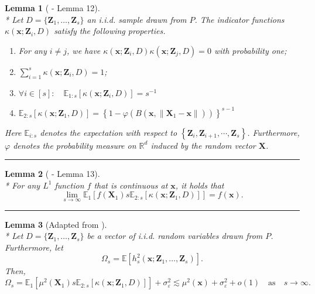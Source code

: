 \documentclass[letterpaper,10pt]{article}
\numberwithin{equation}{section}
\numberwithin{thm}{section}
\newtheorem{lem}{Lemma}
\numberwithin{lem}{section}
\numberwithin{cor}{section}
\newcommand{\E}{\mathbb{E}}
\newcommand{\1}{\mathbbm{1}}
\begin{document}
\begin{lem}[\citet{demirkaya_optimal_2024} - Lemma 12]\label{lem:dem12}\mbox{}\\*
	Let $D = \{\mathbf{Z}_1, \dotsc, \mathbf{Z}_s\}$ an i.i.d. sample drawn from $P$.
	The indicator functions $\kappa\left(\mathbf{x}; \mathbf{Z}_i, D\right)$ satisfy the following properties.
	\begin{enumerate}
		\item For any $i \neq j$, we have $\kappa\left(\mathbf{x}; \mathbf{Z}_i, D\right) \kappa\left(\mathbf{x}; \mathbf{Z}_j, D\right)=0$ with probability one;
		\item $\sum_{i=1}^{s} \kappa\left(\mathbf{x}; \mathbf{Z}_i, D\right)=1$;
		\item $\forall i \in [s]: \quad \mathbb{E}_{1:s}\left[\kappa\left(\mathbf{x}; \mathbf{Z}_i, D\right)\right]=s^{-1}$
		\item $\mathbb{E}_{2: s}\left[\kappa\left(\mathbf{x}; \mathbf{Z}_1, D\right)\right]=\left\{1-\varphi\left(B\left(\mathbf{x},\left\|\mathbf{X}_1-\mathbf{x}\right\|\right)\right)\right\}^{s-1}$
	\end{enumerate}
	Here $\mathbb{E}_{i: s}$ denotes the expectation with respect to $\left\{\mathbf{Z}_i, \mathbf{Z}_{i+1}, \cdots, \mathbf{Z}_s\right\}$.
	Furthermore, $\varphi$ denotes the probability measure on $\mathbb{R}^{d}$ induced by the random vector $\mathbf{X}$.
\end{lem}

\hrule

\begin{lem}[\citet{demirkaya_optimal_2024} - Lemma 13]\label{lem:dem13}\mbox{}\\*
	For any $L^1$ function $f$ that is continuous at $\mathbf{x}$, it holds that
	\begin{equation}
		\lim _{s \rightarrow \infty} \E_1\left[f\left(\mathbf{X}_1\right) s \E_{2: s}\left[\kappa(\mathbf{x}; \mathbf{Z}_1, D)\right]\right]
		= f(\mathbf{x}).
	\end{equation}
\end{lem}

\hrule

\begin{lem}[Adapted from \citet{demirkaya_optimal_2024}]\label{lem:omega_s}\mbox{}\\*
	Let $D = \{\mathbf{Z}_1, \dotsc, \mathbf{Z}_{s}\}$ be a vector of i.i.d. random variables drawn from $P$.
	Furthermore, let
	\begin{equation}
		\Omega_{s}
		= \E\left[h_{s}^{2}\left(\mathbf{x}; \mathbf{Z}_1, \ldots,  \mathbf{Z}_{s}\right)\right].
	\end{equation}
	Then,
	\begin{equation}
		\Omega_{s}
		= \E_1\left[\mu^2\left(\mathbf{X}_1\right) s \E_{2:s}\left[\kappa\left(\mathbf{x}; \mathbf{Z}_1, D\right)\right]\right] + \sigma_{\varepsilon}^2
		\lesssim \mu^2(\mathbf{x}) + \sigma_{\varepsilon}^2 + o(1)
		\quad \text{as} \quad s \rightarrow \infty.
	\end{equation}
\end{lem}
\end{document}
